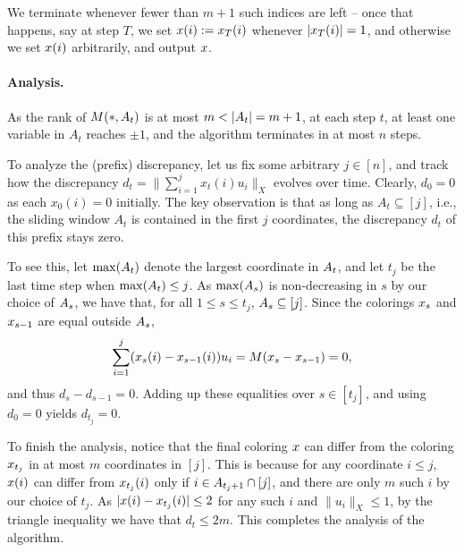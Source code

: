 We terminate whenever fewer
than \(m+1\) such indices are left -- once that happens,
  say at step \(T\), we set \(x(i) := x_T(i)\) whenever
  \(|x_T(i)| = 1\), and otherwise we set \(x(i)\) arbitrarily, and output $x$.

\paragraph{Analysis.} As the rank of \(M(*,A_{t})\) is at most \(m < |A_{t}| = m+1\), at each step $t$, at least one variable in $A_t$ reaches $\pm 1$, and the algorithm terminates in at most $n$ steps.

To analyze the (prefix) discrepancy, let us fix some arbitrary \(j \in [n]\), and track how the discrepancy 
$d_t = \|\sum_{i=1}^j x_t(i) u_i \|_X$ evolves over time. Clearly, $d_0=0$ as each $x_0(i)=0$ initially.
The key observation is that as long as $A_t \subseteq [j]$, i.e., the sliding window $A_t$ is contained in the first $j$ coordinates, the discrepancy $d_t$ of this prefix stays zero.

To see this, let $\max(A_t)$ denote the largest coordinate in $A_t$, and let $t_j$ be the last time step when
  \( \max(A_t)\leq j\).   
  As \(\max (A_s)\) is non-decreasing in $s$ by our choice of
  \(A_s\), we have that, for all \(1 \le s \le t_j\), \(A_{s} \subseteq
  [j]\). Since the colorings \(x_s\) and \(x_{s-1}\) are equal
  outside \(A_{s}\),
  \[
    \sum_{i=1}^j (x_s(i) - x_{s-1}(i))u_i =  M (x_s -
    x_{s-1}) = 0,
  \]
  and thus $d_{s}-d_{s-1} = 0$.
  Adding up these equalities over \(s \in [t_j]\), and using
  \(d_0 = 0\) yields $d_{t_j}=0$. 

  To finish the analysis, notice that the final coloring \(x\) can differ 
  from the coloring
  \(x_{t_j}\)
  in at most \(m\) coordinates in
  \([j]\). This is because for any coordinate \(i \le j\),  \(x(i)\) can differ from  \(x_{t_j}(i)\)
  only if \(i \in A_{t_j+1} \cap [j]\), and there are only
  \(m\) such \(i\) by our choice of $t_j$.
  As \(|x(i) -x_{t_j}(i)|\leq 2\) for any such $i$ and $\|u_i\|_X\leq 1$,  by the triangle inequality we have that $d_t \leq 2m$. This completes the analysis of the algorithm.
  
